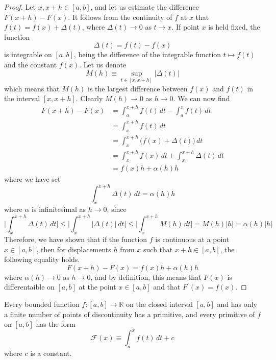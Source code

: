     \begin{proof}
      Let $x, x + h \in [a, b]$, and let us estimate the difference $F(x+h) - F(x)$. It follows from the continuity of $f$ at $x$ that $f(t) = f(x) + \Delta(t)$, where $\Delta(t) \rightarrow 0$ as $t \rightarrow x$. If point $x$ is held fixed, the function 
      \[\Delta(t) = f(t) - f(x)\]
      is integrable on $[a, b]$, being the difference of the integrable function $t \mapsto f(t)$ and the constant $f(x)$. Let us denote
      \[M(h) \equiv \sup_{t \in [x, x+h]} |\Delta(t)|\]
      which means that $M(h)$ is the largest difference between $f(x)$ and $f(t)$ in the interval $[x, x+h]$. Clearly $M(h) \rightarrow 0$ as $h \rightarrow 0$. We can now find
      \begin{align*}
          F(x + h) - F(x) & = \int_a^{x+h} f(t)\,dt - \int_a^x f(t)\,dt \\
          & = \int_x^{x+h} f(t)\,dt \\
          & = \int_x^{x+h} \big( f(x) + \Delta(t)\big)\,dt \\
          & = \int_x^{x+h} f(x)\,dt + \int_x^{x+h} \Delta(t)\,dt \\
          & = f(x) h + \alpha(h) h
      \end{align*}
      where we have set 
      \[\int_x^{x+h} \Delta(t)\,dt = \alpha(h) h\]
      where $\alpha$ is infinitesimal as $h \rightarrow 0$, since 
      \[\Bigg| \int_x^{x+h} \Delta(t)\,dt \Bigg| \leq \Bigg| \int_x^{x+h} |\Delta(t)|\,dt \Bigg| \leq \Bigg| \int_x^{x+h} M(h)\,dt \Bigg| = M(h) |h| = \alpha(h)|h|\]
      Therefore, we have shown that if the function $f$ is continuous at a point $x \in [a, b]$, then for displacements $h$ from $x$ such that $x +h \in [a, b]$, the following equality holds.
      \[F(x + h) - F(x) = f(x) h + \alpha(h) h\]
      where $\alpha(h) \rightarrow 0$ as $h \rightarrow 0$, and by definition, this means that $F(x)$ is differentaible on $[a, b]$ at the point $x \in [a, b]$ and that $F^\prime(x) = f(x)$. 
    \end{proof}

    \begin{corollary}
    Every bounded function $f: [a, b] \longrightarrow \mathbb{R}$ on the closed interval $[a, b]$ and has only a finite number of points of discontinuity has a primitive, and every primitive of $f$ on $[a, b]$ has the form 
    \[\mathcal{F}(x) \equiv \int_a^x f(t)\,dt + c\]
    where $c$ is a constant. 
    \end{corollary}

